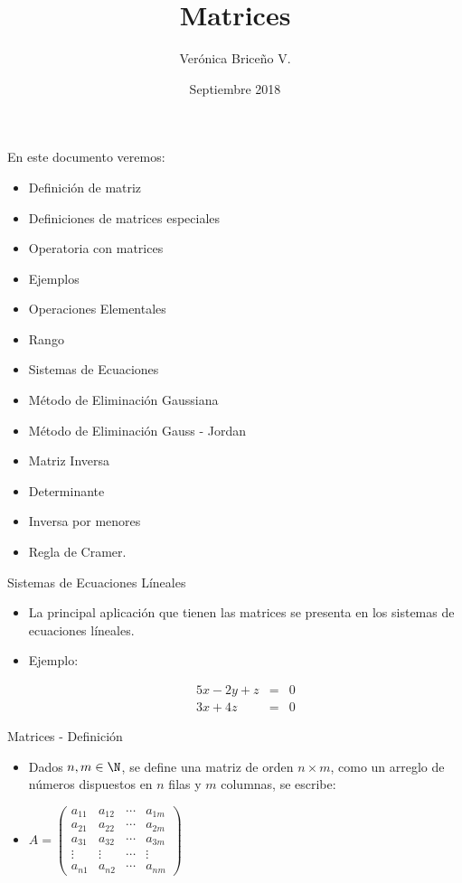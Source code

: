 \title{Matrices}
\author{Verónica Brice\~no V.}
\date{Septiembre 2018}



En este documento veremos:

\begin{itemize}
\item
Definición de matriz
\item
Definiciones  de matrices especiales
\item
Operatoria con matrices
\item
Ejemplos
\item
Operaciones Elementales
\item
Rango
\item
Sistemas de Ecuaciones
\item
Método de Eliminación Gaussiana
\item
Método de Eliminación Gauss - Jordan
\item
Matriz Inversa
\item
Determinante
\item
Inversa por menores
\item
Regla de Cramer.
\end{itemize}



{Sistemas de Ecuaciones Líneales}

\begin{itemize}
\item
La principal aplicación que tienen las matrices se presenta en los sistemas de ecuaciones líneales.

\item
Ejemplo:

\begin{eqnarray*}
5x- 2y +z  &=& 0\\
3x+4z       &=&  0
\end{eqnarray*}
\end{itemize}




{Matrices - Definición}

\begin{itemize}
\item
Dados $n, m \in  \N$, se define una matriz de orden $n \times m$, como un arreglo de números dispuestos en  $n$ filas y $m$ columnas, se escribe: 

\item
$A = \left(
\begin{array}{cccc}
a_{11} & a_{12} & \cdots & a_{1m}\\
a_{21} & a_{22} & \cdots & a_{2m}\\
a_{31} & a_{32} & \cdots & a_{3m}\\
\vdots  & \vdots  & \cdots & \vdots\\
a_{n1} & a_{n2} & \cdots & a_{nm}
\end{array}
\right)$
\end{itemize}



